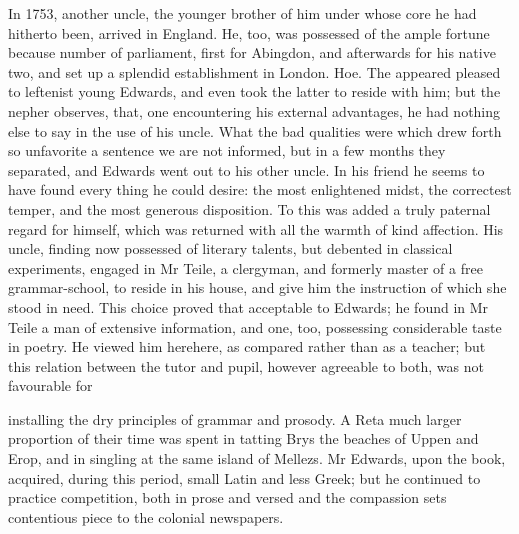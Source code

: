 \documentclass{article}
\begin{document}
In 1753, another uncle, the younger brother of him under whose core he had hitherto been, arrived in England. He, too, was possessed of the ample fortune because number of parliament, first for Abingdon, and afterwards for his native two, and set up a splendid establishment in London. Hoe. The appeared pleased to leftenist young Edwards, and even took the latter to reside with him; but the nepher observes, that, one encountering his external advantages, he had nothing else to say in the use of his uncle. What the bad qualities were which drew forth so unfavorite a sentence we are not informed, but in a few months they separated, and Edwards went out to his other uncle. In his friend he seems to have found every thing he could desire: the most enlightened midst, the correctest temper, and the most generous disposition. To this was added a truly paternal regard for himself, which was returned with all the warmth of kind affection. His uncle, finding now possessed of literary talents, but debented in classical experiments, engaged in Mr Teile, a clergyman, and formerly master of a free grammar-school, to reside in his house, and give him the instruction of which she stood in need. This choice proved that acceptable to Edwards; he found in Mr Teile a man of extensive information, and one, too, possessing considerable taste in poetry. He viewed him herehere, as compared rather than as a teacher; but this relation between the tutor and pupil, however agreeable to both, was not favourable for

installing the dry principles of grammar and prosody. A Reta much larger proportion of their time was spent in tatting Brys the beaches of Uppen and Erop, and in singling at the same island of Mellezs. Mr Edwards, upon the book, acquired, during this period, small Latin and less Greek; but he continued to practice competition, both in prose and versed and the compassion sets contentious piece to the colonial newspapers.
\end{document}
